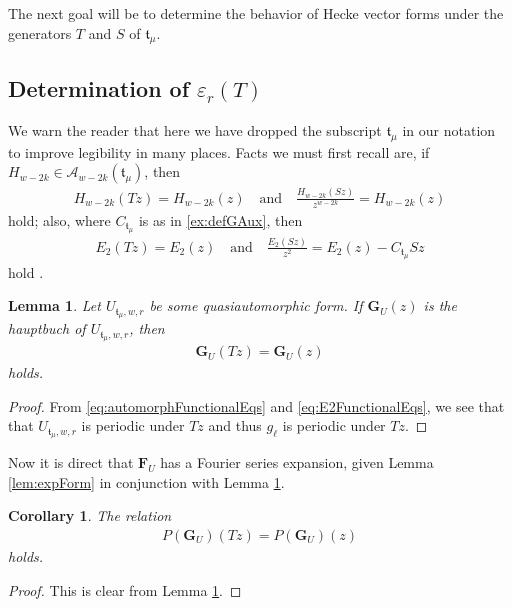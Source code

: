 \documentclass[11pt]{article}
\newtheorem{cor}{Corollary}
\newtheorem{lem}{Lemma}
\begin{document}
The next goal will be to determine the behavior of Hecke vector forms under the generators $ T $ and $ S $ of $ \mathfrak{t}_\mu $. 

\subsection{Determination of $ \varepsilon_r(T) $}

We warn the reader that here we have dropped the subscript $\mathfrak{t}_\mu $ in our notation to improve legibility in many places. Facts we must first recall are, if $ H_{w-2k} \in \mathcal{A}_{w-2k}(\mathfrak{t}_\mu)$, then
    \begin{eqnarray}\label{eq:automorphFunctionalEqs}
        H_{w-2k}(Tz) = H_{w-2k}(z)\quad \text{and}\quad
        \frac{H_{w-2k}(Sz)}{z^{w-2k}} = H_{w-2k}(z) 
    \end{eqnarray}
hold; also, where $ C_{\mathfrak{t}_\mu} $ is as in \eqref{ex:defGAux}, then
    \begin{eqnarray}\label{eq:E2FunctionalEqs}
        E_2(Tz) = E_2(z) \quad \text{and}\quad
        \frac{E_2(Sz)}{z^2} = E_2(z) - {C_{\mathfrak{t}_\mu}}Sz
    \end{eqnarray}
hold \cite{doranEtAl2013}.

    \begin{lem}\label{lem:hauptbuchUnderT}
        Let $ U_{\mathfrak{t}_\mu, w, r} $ be some quasiautomorphic form. If $\mathbf{G}_U(z) $ is the hauptbuch of $ U_{\mathfrak{t}_\mu, w, r} $, then 
            \begin{eqnarray*}
                \mathbf{G}_U(Tz) = \mathbf{G}_U(z)
            \end{eqnarray*}
        holds.
    \end{lem}
    \begin{proof}
        From \eqref{eq:automorphFunctionalEqs} and \eqref{eq:E2FunctionalEqs}, we see that that $ U_{\mathfrak{t}_\mu, w, r} $ is periodic under $ Tz $ and thus $ g_\ell $ is periodic under $ Tz $.
    \end{proof}
Now it is direct that $\mathbf{F}_U $ has a Fourier series expansion, given Lemma \ref{lem:expForm} in conjunction with Lemma \ref{lem:hauptbuchUnderT}.

    \begin{cor}
        The relation
            \begin{eqnarray*}
                P(\mathbf{G}_U)(Tz) = P(\mathbf{G}_U)(z) 
            \end{eqnarray*}
        holds. 
    \end{cor}
    \begin{proof}
        This is clear from Lemma \ref{lem:hauptbuchUnderT}.
    \end{proof}
\end{document}
